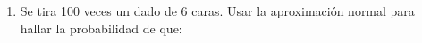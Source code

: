 \documentclass[11pt,a4paper,twoside]{article}%
\begin{document}
\begin{enumerate}
%
%
%

\item Se tira 100 veces un dado de 6 caras. Usar la aproximaci\'{o}n normal
para hallar la probabilidad de que:


\end{enumerate}
\end{document}
